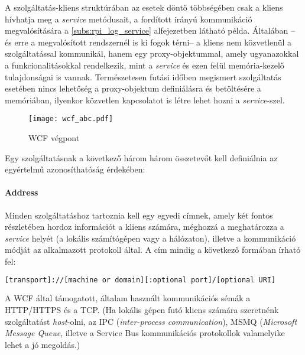 A szolgáltatás-kliens struktúrában az esetek döntő többségében csak a kliens hívhatja meg a \emph{service} metódusait, a fordított irányú kommunikáció megvalósítására a \ref{subs:rpi_log_service} alfejezetben látható példa. Általában -- és erre a megvalósított rendszernél is ki fogok térni-- a kliens nem közvetlenül a szolgáltatással kommunikál, hanem egy proxy-objektummal, amely ugyanazokkal a funkcionalitásokkal rendelkezik, mint a \emph{service} és ezen felül memória-kezelő tulajdonságai is vannak. Természetesen futási időben megismert szolgáltatás esetében nincs lehetőség a proxy-objektum definiálásra és betöltésére a memóriában, ilyenkor közvetlen kapcsolatot is létre lehet hozni a \emph{service}-szel. \cite{wcf-programming}
\begin{figure}[h]
\vspace{.5cm}
\texttt{[image: wcf\_abc.pdf]}
\centering
\vspace{.2cm}
\caption{WCF végpont}
\vspace{.5cm}
\label{fig:wcf_abc}
\end{figure}

Egy szolgáltatásnak a következő három három összetevőt kell definiálnia az egyértelmű azonosíthatóság érdekében:
\paragraph{Address} Minden szolgáltatáshoz tartoznia kell egy egyedi címnek, amely két fontos részletében hordoz információt a kliens számára, méghozzá a meghatározza a \emph{service} helyét (a lokális számítógépen vagy a hálózaton), illetve a kommunikáció módját az alkalmazott protokoll által. A cím mindig a következő formában írható fel:

\begin{mdframed}[backgroundcolor=gray!20]
\begin{scriptsize}
\begin{lstlisting}[language=bash]
[transport]://[machine or domain][:optional port]/[optional URI]
\end{lstlisting}
\end{scriptsize}
\end{mdframed}

A WCF által támogatott, általam használt kommunikációs sémák a HTTP/HTTPS és a TCP. (Ha lokális gépen futó kliens számára szeretnénk szolgáltatást \emph{host}-olni, az IPC (\emph{inter-process communication}), MSMQ (\emph{Microsoft Message Queue}, illetve a Service Bus kommunikációs protokollok valamelyike lehet a jó megoldás.)
